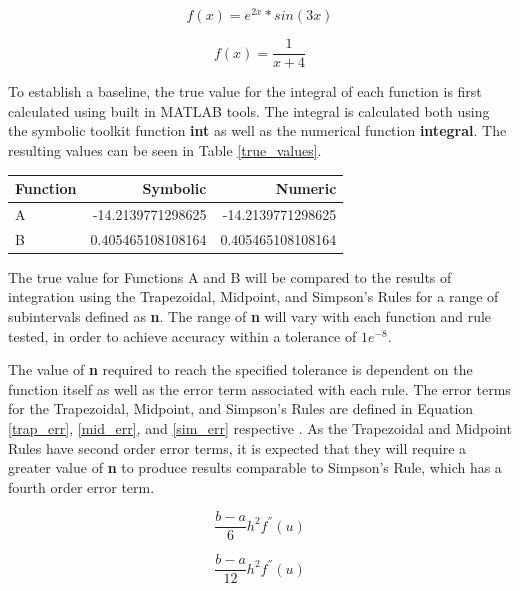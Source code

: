 \documentclass[a4paper]{article}
\begin{document}
\begin{equation}
f(x) = e^{2x} * sin(3x)
\label{eq:fa}
\end{equation}

\begin{equation}
f(x) = \frac{1}{x+4}
\label{eq:fb}
\end{equation}


To establish a baseline, the true value for the integral of each function is first calculated using built in MATLAB tools. The integral is calculated both using the symbolic toolkit function \textbf{int} as well as the numerical function \textbf{integral}. The resulting values can be seen in Table \ref{true_values}.


\bgroup
\def\arraystretch{1.5}
\begin{center}
	\centering
	\begin{tabular}{l|r|r}
	\textbf{Function} & \textbf{Symbolic} & \textbf{Numeric} \\
	\hline
	A & -14.2139771298625 & -14.2139771298625\\
	B & 0.405465108108164 & 0.405465108108164
	\end{tabular}
	\label{true_values}
\end{center}
\egroup

The true value for Functions A and B will be compared to the results of integration using the Trapezoidal, Midpoint, and Simpson's Rules for a range of subintervals defined as \textbf{n}. The range of \textbf{n} will vary with each function and rule tested, in order to achieve accuracy within a tolerance of $1e^{-8}$.

The value of \textbf{n} required to reach the specified tolerance is dependent on the function itself as well as the error term associated with each rule. The error terms for the Trapezoidal, Midpoint, and Simpson's Rules are defined in Equation \ref{trap_err}, \ref{mid_err}, and \ref{sim_err} respective \citep{burden2010}. As the Trapezoidal and Midpoint Rules have second order error terms, it is expected that they will require a greater value of \textbf{n} to produce results comparable to Simpson's Rule, which has a fourth order error term.

\begin{equation}
\frac{b-a}{6}h^2f^{''}(u)
\label{trap_err}
\end{equation}

\begin{equation}
\frac{b-a}{12}h^2f^{''}(u)
\label{mid_err}
\end{equation}
\end{document}
